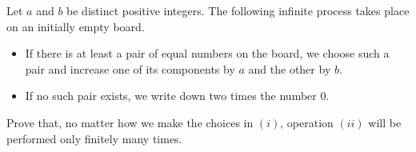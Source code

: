 Let $a$ and $b$ be distinct positive integers. The following infinite process takes place on an initially empty board.

\begin{itemize}
\item[$(i)$] If there is at least a pair of equal numbers on the board, we choose such a pair and increase one of its components by $a$ and the other by $b$.
\item[$(ii)$] If no such pair exists, we write down two times the number $0$.
\end{itemize}

Prove that, no matter how we make the choices in $(i)$, operation $(ii)$ will be performed only finitely many times.
